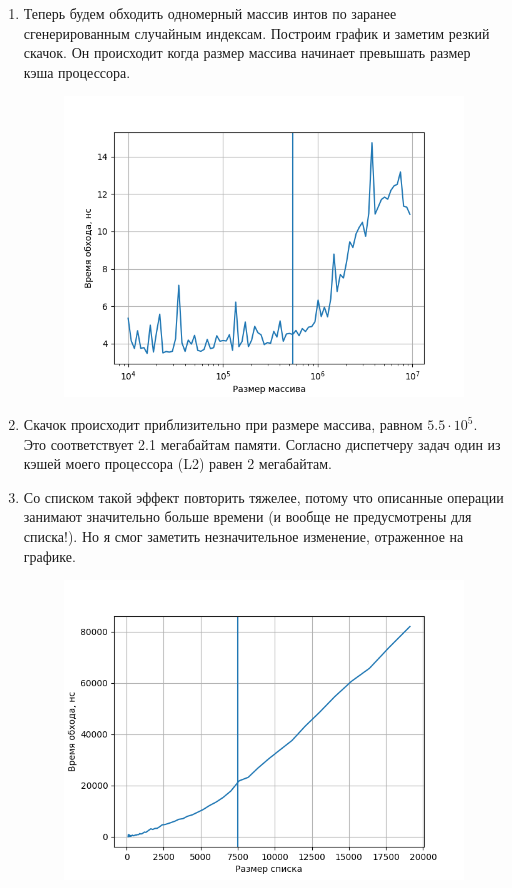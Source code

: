 \documentclass[a4paper,12pt]{article}
\begin{document}
\begin{enumerate}
\item Теперь будем обходить одномерный массив интов по заранее сгенерированным случайным индексам. Построим график и заметим резкий скачок. Он происходит когда размер массива начинает превышать размер кэша процессора. 

\begin{figure}[H]
  \centering
  \includegraphics[width=1\linewidth]{images/asm7_3.png}
\end{figure}

\item Скачок происходит приблизительно при размере массива, равном $5.5\cdot10^5$. Это соответствует 2.1 мегабайтам памяти. Согласно диспетчеру задач один из кэшей моего процессора (L2) равен 2 мегабайтам.

\item Со списком такой эффект повторить тяжелее, потому что описанные операции занимают значительно больше времени (и вообще не предусмотрены для списка!). Но я смог заметить незначительное изменение, отраженное на графике.

\begin{figure}[H]
  \centering
  \includegraphics[width=1\linewidth]{images/asm7_4.png}
\end{figure}


\end{enumerate}
\end{document}
